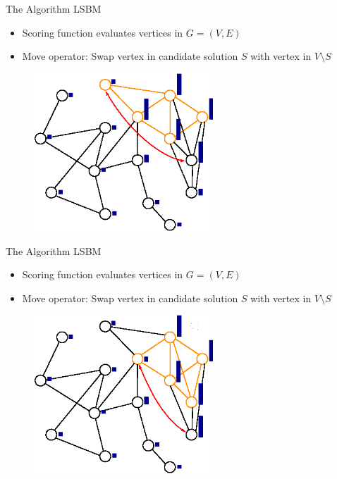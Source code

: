 \documentclass{beamer}
\begin{document}
\begin{frame}{The Algorithm LSBM}
    \begin{itemize}
        \item Scoring function evaluates vertices in $G = (V, E)$
        \item Move operator: Swap vertex in candidate solution $S$ with vertex in $V \setminus S$
    \end{itemize}
    \begin{figure}
        \centering
        \includegraphics[width=0.6\textwidth]{graphics/algorithm_poster_3.eps}
    \end{figure}
\end{frame}

\begin{frame}{The Algorithm LSBM}
    \begin{itemize}
        \item Scoring function evaluates vertices in $G = (V, E)$
        \item Move operator: Swap vertex in candidate solution $S$ with vertex in $V \setminus S$
    \end{itemize}
    \begin{figure}
        \centering
        \includegraphics[width=0.6\textwidth]{graphics/algorithm_poster_4.eps}
    \end{figure}
\end{frame}
\end{document}
